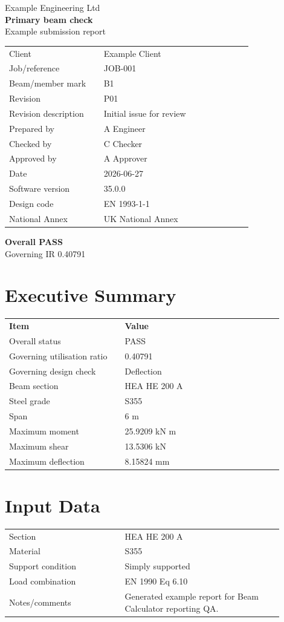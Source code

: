 \documentclass[11pt,a4paper]{article}
\begin{document}
\begin{titlepage}
\centering
{\Large Example Engineering Ltd\\[6mm]}
{\LARGE\bfseries Primary beam check\\[6mm]}
{\large Example submission report\\[3mm]}
\begin{longtable}{p{0.35\linewidth}p{0.55\linewidth}}
Client & Example Client \\
Job/reference & JOB-001 \\
Beam/member mark & B1 \\
Revision & P01 \\
Revision description & Initial issue for review \\
Prepared by & A Engineer \\
Checked by & C Checker \\
Approved by & A Approver \\
Date & 2026-06-27 \\
Software version & 35.0.0 \\
Design code & EN 1993-1-1 \\
National Annex & UK National Annex \\
\end{longtable}
\vfill
{\Huge\bfseries Overall PASS\\[3mm]}
{\Large Governing IR 0.40791}
\end{titlepage}

\section{Executive Summary}
\begin{longtable}{p{0.38\linewidth}p{0.52\linewidth}}
\textbf{Item} & \textbf{Value} \\
Overall status & PASS \\
Governing utilisation ratio & 0.40791 \\
Governing design check & Deflection \\
Beam section & HEA HE 200 A \\
Steel grade & S355 \\
Span & 6 m \\
Maximum moment & 25.9209 kN m \\
Maximum shear & 13.5306 kN \\
Maximum deflection & 8.15824 mm \\
\end{longtable}

\section{Input Data}
\begin{longtable}{p{0.38\linewidth}p{0.52\linewidth}}
Section & HEA HE 200 A \\
Material & S355 \\
Support condition & Simply supported \\
Load combination & EN 1990 Eq 6.10 \\
Notes/comments & Generated example report for Beam Calculator reporting QA. \\
\end{longtable}
\end{document}
